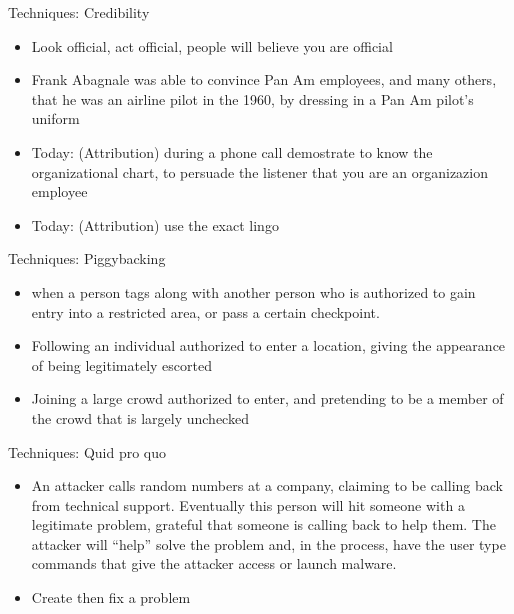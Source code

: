 \documentclass{beamer}
\begin{document}
\begin{frame}{Techniques: Credibility}
  \begin{itemize}
    \item Look official, act official, people will believe you are official
    \item Frank Abagnale was able to
      convince Pan Am employees, and many others, that he was an
      airline pilot in the 1960, by dressing in a Pan Am pilot's uniform
    \item<2-> Today: (Attribution) during a phone call demostrate to know
      the organizational chart, to persuade the listener that you are
      an organizazion employee
    \item<2-> Today: (Attribution) use the exact lingo
  \end{itemize}
\end{frame}


\begin{frame}{Techniques: Piggybacking}

  \begin{itemize}
    \item when a person tags along with
another person who is authorized to gain entry into a restricted area,
or pass a certain checkpoint.
    \item Following an individual authorized to enter
      a location, giving the appearance of being legitimately escorted
    \item Joining a large crowd authorized to enter, and pretending to
      be a member of the crowd that is largely unchecked
  \end{itemize}

\end{frame}


\begin{frame}{Techniques: Quid pro quo}
  
  \begin{itemize}
    \item An attacker calls random numbers at a company, claiming to
      be calling back from technical support. Eventually this person
      will hit someone with a legitimate problem, grateful that
      someone is calling back to help them. The attacker will ``help''
      solve the problem and, in the process, have the user type
      commands that give the attacker access or launch malware.
    \item Create then fix a problem
  \end{itemize}
\end{frame}
\end{document}
